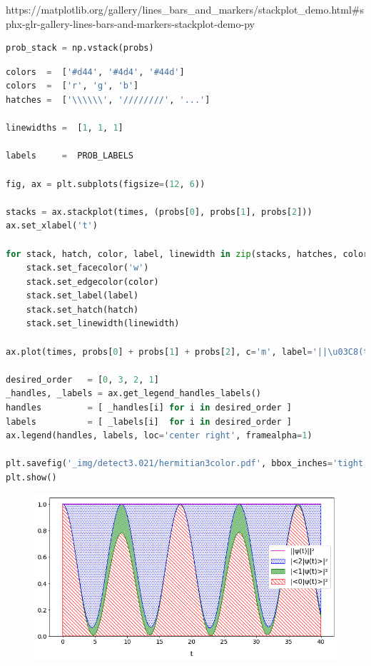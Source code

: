 https://matplotlib.org/gallery/lines\_bars\_and\_markers/stackplot\_demo.html\#sphx-glr-gallery-lines-bars-and-markers-stackplot-demo-py

\begin{lstlisting}[language=Python]
prob_stack = np.vstack(probs)
\end{lstlisting}

\begin{lstlisting}[language=Python]
colors  =  ['#d44', '#4d4', '#44d']
colors  =  ['r', 'g', 'b']
hatches =  ['\\\\\\', '////////', '...']

linewidths =  [1, 1, 1]

labels     =  PROB_LABELS

fig, ax = plt.subplots(figsize=(12, 6))

stacks = ax.stackplot(times, (probs[0], probs[1], probs[2]))
ax.set_xlabel('t')

for stack, hatch, color, label, linewidth in zip(stacks, hatches, colors, labels, linewidths):
    stack.set_facecolor('w')
    stack.set_edgecolor(color)
    stack.set_label(label)
    stack.set_hatch(hatch)
    stack.set_linewidth(linewidth)

ax.plot(times, probs[0] + probs[1] + probs[2], c='m', label='||\u03C8(t)||\u00B2', linewidth=1.5)

desired_order   = [0, 3, 2, 1]
_handles, _labels = ax.get_legend_handles_labels()
handles         = [ _handles[i] for i in desired_order ]
labels          = [ _labels[i]  for i in desired_order ]
ax.legend(handles, labels, loc='center right', framealpha=1)

plt.savefig('_img/detect3.021/hermitian3color.pdf', bbox_inches='tight', pad_inches=0)
plt.show()
\end{lstlisting}

\begin{figure}[h!]
\centering
\includegraphics[width=0.66\linewidth]{tex/appendix/nb/jupyter/3lev/output_20_0.png}

\end{figure}

